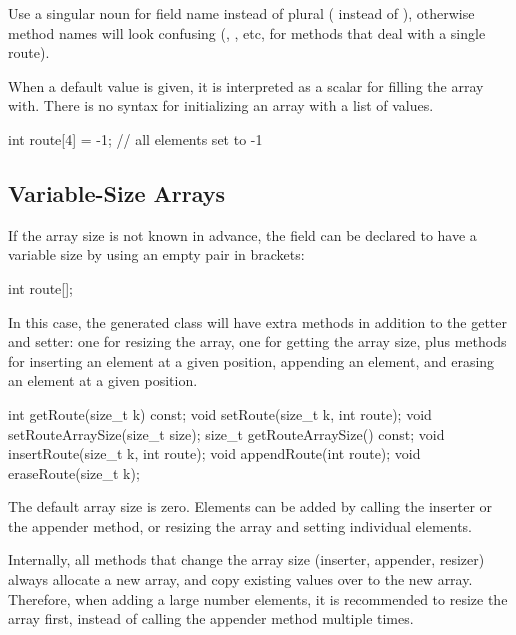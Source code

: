 \begin{note}
  Use a singular noun for field name instead of plural ( instead of
  ), otherwise method names will look confusing (,
  , etc, for methods that deal with a single route).
\end{note}

When a default value is given, it is interpreted as a scalar for filling the
array with. There is no syntax for initializing an array with a list of values.

\begin{msg}
int route[4] = -1; // all elements set to -1
\end{msg}


\subsection{Variable-Size Arrays}
\label{sec:msg-defs:variable-size-arrays}

If the array size is not known in advance, the field can be declared
to have a variable size by using an empty pair in brackets:

\begin{msg}
int route[];
\end{msg}

In this case, the generated class will have extra methods in addition to the
getter and setter: one for resizing the array, one for getting the array size,
plus methods for inserting an element at a given position, appending an element,
and erasing an element at a given position.

\begin{cpp}
int getRoute(size_t k) const;
void setRoute(size_t k, int route);
void setRouteArraySize(size_t size);
size_t getRouteArraySize() const;
void insertRoute(size_t k, int route);
void appendRoute(int route);
void eraseRoute(size_t k);
\end{cpp}

The default array size is zero. Elements can be added by calling the inserter
or the appender method, or resizing the array and setting individual elements.

Internally, all methods that change the array size (inserter, appender, resizer)
always allocate a new array, and copy existing values over to the new array.
Therefore, when adding a large number elements, it is recommended to resize the
array first, instead of calling the appender method multiple times.

